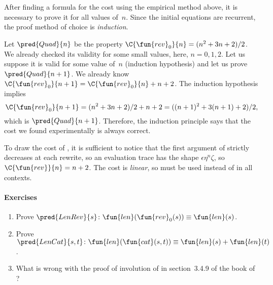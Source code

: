 After finding a formula for the cost using the empirical method above,
it is necessary to prove it for all values of~\(n\). Since the initial
equations are recurrent, the proof method of choice is
\emph{induction}.

Let \(\pred{Quad}{n}\) be the property
\(\C{\fun{rev}_0}{n} = (n^2 + 3n + 2)/2\). We already checked its
validity for some small values, here, \(n = 0, 1, 2\). Let us suppose
it is valid for some value of~\(n\) (induction hypothesis) and let us
prove \(\pred{Quad}{n+1}\). We already know \(\C{\fun{rev}_0}{n+1} =
\C{\fun{rev}_0}{n} + n + 2\). The
induction hypothesis implies
\begin{equation*}
\C{\fun{rev}_0}{n+1} = (n^2 + 3n + 2)/2 + n + 2
                     = ((n+1)^2 + 3(n+1) + 2)/2,
\end{equation*}
which is \(\pred{Quad}{n+1}\). Therefore,
the induction principle says that the cost we found experimentally is
always correct.

To draw the cost of , it is
sufficient to notice that the first argument of
 strictly decreases at each
rewrite, so an evaluation trace has the shape \(\epsilon\eta^n\zeta\),
so \(\C{\fun{rev}}{n} = n + 2\). The cost is
\emph{linear}, so
 must be used instead of
 in all contexts.

\paragraph{Exercises}

\begin{enumerate}

  \item Prove \(\pred{LenRev}{s} \colon \fun{len}(\fun{rev}_0(s)) \equiv
  \fun{len}(s)\).

  \item Prove \(\pred{LenCat}{s,t} \colon \fun{len}(\fun{cat}(s,t)) \equiv
  \fun{len}(s) + \fun{len}(t)\).

  \item What is wrong with the proof of involution of
   in section~3.4.9 of the book of
  \cite{CousineauMauny_1998}?

\end{enumerate}
